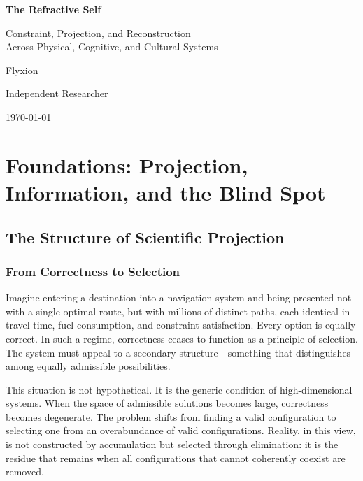 \documentclass[11pt,openany]{book}
\begin{document}
\frontmatter

\begin{titlepage}
\centering
\vspace*{3cm}
{\Huge\bfseries The Refractive Self\par}
\vspace{1cm}
{\Large Constraint, Projection, and Reconstruction\\
Across Physical, Cognitive, and Cultural Systems\par}
\vspace{2cm}
{\large Flyxion\par}
{\normalsize Independent Researcher\par}
\vfill
{\large \today\par}
\end{titlepage}

\tableofcontents
\listoftheorems[ignoreall, show={theorem,proposition,corollary,definition}]

\mainmatter

\part{Foundations: Projection, Information, and the Blind Spot}

\chapter{The Structure of Scientific Projection}
\label{ch:projection}

\section*{ From Correctness to Selection}

Imagine entering a destination into a navigation system and being presented not with a single optimal route, but with millions of distinct paths, each identical in travel time, fuel consumption, and constraint satisfaction. Every option is equally correct. In such a regime, correctness ceases to function as a principle of selection. The system must appeal to a secondary structure—something that distinguishes among equally admissible possibilities.

This situation is not hypothetical. It is the generic condition of high-dimensional systems. When the space of admissible solutions becomes large, correctness becomes degenerate. The problem shifts from finding a valid configuration to selecting one from an overabundance of valid configurations. Reality, in this view, is not constructed by accumulation but selected through elimination: it is the residue that remains when all configurations that cannot coherently coexist are removed.
\end{document}

